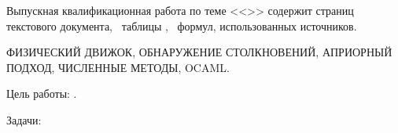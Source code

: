 
Выпускная квалификационная работа по теме <<\Topic>> содержит
\pageref{LastPage} страниц текстового документа,
\totaltables~таблицы \TODO,
\totalequations~формул,
 использованных источников.

\MakeUppercase{
    физический движок,
    обнаружение столкновений,
    априорный подход,
    численные методы,
    OCaml.
}

Цель работы: \Target.

Задачи:

\Tasks
